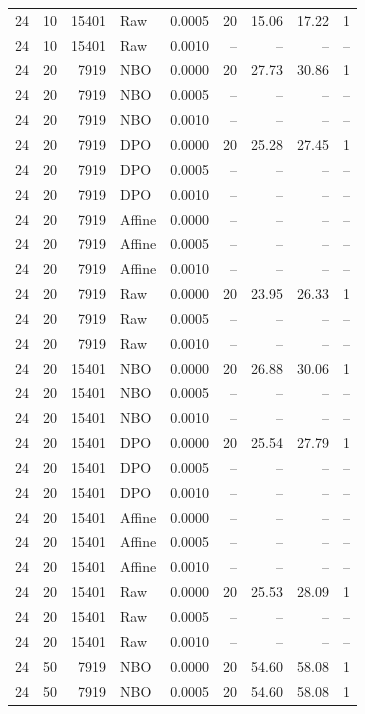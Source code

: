 \begin{longtable}{lrrlrrrrr}
24 & 10 & 15401 & Raw & 0.0005 & 20 & 15.06 & 17.22 & 1\\
24 & 10 & 15401 & Raw & 0.0010 & -- & -- & -- & --\\
24 & 20 & 7919 & NBO & 0.0000 & 20 & 27.73 & 30.86 & 1\\
24 & 20 & 7919 & NBO & 0.0005 & -- & -- & -- & --\\
24 & 20 & 7919 & NBO & 0.0010 & -- & -- & -- & --\\
24 & 20 & 7919 & DPO & 0.0000 & 20 & 25.28 & 27.45 & 1\\
24 & 20 & 7919 & DPO & 0.0005 & -- & -- & -- & --\\
24 & 20 & 7919 & DPO & 0.0010 & -- & -- & -- & --\\
24 & 20 & 7919 & Affine & 0.0000 & -- & -- & -- & --\\
24 & 20 & 7919 & Affine & 0.0005 & -- & -- & -- & --\\
24 & 20 & 7919 & Affine & 0.0010 & -- & -- & -- & --\\
24 & 20 & 7919 & Raw & 0.0000 & 20 & 23.95 & 26.33 & 1\\
24 & 20 & 7919 & Raw & 0.0005 & -- & -- & -- & --\\
24 & 20 & 7919 & Raw & 0.0010 & -- & -- & -- & --\\
24 & 20 & 15401 & NBO & 0.0000 & 20 & 26.88 & 30.06 & 1\\
24 & 20 & 15401 & NBO & 0.0005 & -- & -- & -- & --\\
24 & 20 & 15401 & NBO & 0.0010 & -- & -- & -- & --\\
24 & 20 & 15401 & DPO & 0.0000 & 20 & 25.54 & 27.79 & 1\\
24 & 20 & 15401 & DPO & 0.0005 & -- & -- & -- & --\\
24 & 20 & 15401 & DPO & 0.0010 & -- & -- & -- & --\\
24 & 20 & 15401 & Affine & 0.0000 & -- & -- & -- & --\\
24 & 20 & 15401 & Affine & 0.0005 & -- & -- & -- & --\\
24 & 20 & 15401 & Affine & 0.0010 & -- & -- & -- & --\\
24 & 20 & 15401 & Raw & 0.0000 & 20 & 25.53 & 28.09 & 1\\
24 & 20 & 15401 & Raw & 0.0005 & -- & -- & -- & --\\
24 & 20 & 15401 & Raw & 0.0010 & -- & -- & -- & --\\
24 & 50 & 7919 & NBO & 0.0000 & 20 & 54.60 & 58.08 & 1\\
24 & 50 & 7919 & NBO & 0.0005 & 20 & 54.60 & 58.08 & 1\\

\end{longtable}
